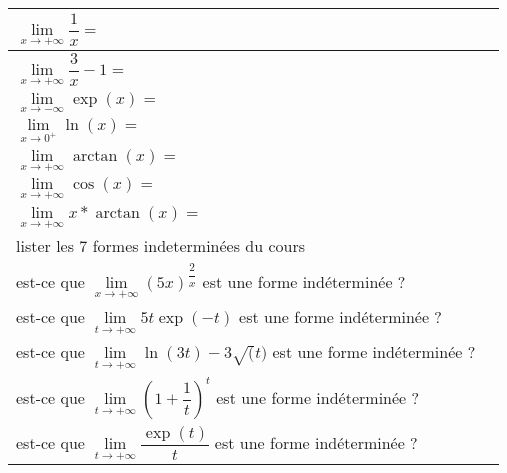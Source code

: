 \documentclass{article}
\begin{document}
\renewcommand{\arraystretch}{3}

\begin{tabular}{|p{4cm}|p{12cm}|}
\hline $\lim\limits_{x \rightarrow +\infty} \dfrac{1}{x} = $ & \\
\hline $\lim\limits_{x \rightarrow +\infty} \dfrac{3}{x} - 1= $ & \\
\hline $\lim\limits_{x \rightarrow -\infty} \exp(x) = $ & \\
\hline $\lim\limits_{x \rightarrow 0^+} \ln(x) = $ & \\
\hline $\lim\limits_{x \rightarrow +\infty} \arctan(x) =$ & \\
\hline $\lim\limits_{x \rightarrow +\infty} \cos(x) =$ & \\
\hline $\lim\limits_{x \rightarrow +\infty} x*\arctan(x) =$ & \\
\hline lister les 7 formes indeterminées du cours & \\
\hline est-ce que $\lim\limits_{x \rightarrow +\infty}(5x)^{\dfrac{2}{x}}$ est une forme indéterminée ? & \\
 \hline est-ce que $\lim\limits_{t \rightarrow +\infty}5t\exp(-t) $ est une forme indéterminée ? & \\
 \hline est-ce que $\lim\limits_{t \rightarrow +\infty}\ln(3t) - 3\sqrt(t) $ est une forme indéterminée ? & \\
 \hline est-ce que $\lim\limits_{t \rightarrow +\infty}(1+\dfrac{1}{t})^t $ est une forme indéterminée ? & \\
 \hline est-ce que $\lim\limits_{t \rightarrow +\infty}\dfrac{\exp(t)}{t} $ est une forme indéterminée ? & \\
 \hline\end{tabular}
\end{document}
